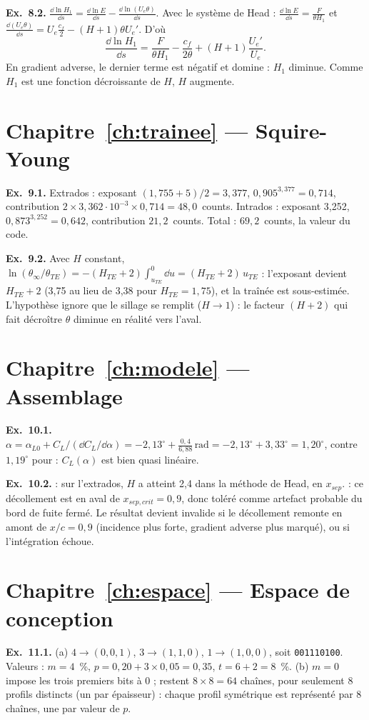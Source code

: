 \textbf{Ex.~8.2.} $\frac{\dd\ln H_1}{\dd s}=\frac{\dd\ln E}{\dd s}-\frac{\dd\ln(U_e\theta)}{\dd s}$. Avec le système de Head : $\frac{\dd\ln E}{\dd s}=\frac{F}{\theta H_1}$ et $\frac{\dd(U_e\theta)}{\dd s}=U_e\frac{c_f}{2}-(H+1)\theta U_e'$. D'où
\[
\frac{\dd\ln H_1}{\dd s}=\frac{F}{\theta H_1}-\frac{c_f}{2\theta}+(H+1)\frac{U_e'}{U_e}.
\]
En gradient adverse, le dernier terme est négatif et domine : $H_1$ diminue. Comme $H_1$ est une fonction décroissante de $H$, $H$ augmente.

\section*{Chapitre~\ref{ch:trainee} — Squire-Young}
\textbf{Ex.~9.1.} Extrados : exposant $(1{,}755+5)/2=3{,}377$, $0{,}905^{3{,}377}=0{,}714$, contribution $2\times3{,}362\cdot10^{-3}\times0{,}714=48{,}0$~counts. Intrados : exposant 3,252, $0{,}873^{3{,}252}=0{,}642$, contribution $21{,}2$~counts. Total : $69{,}2$~counts, la valeur du code.

\textbf{Ex.~9.2.} Avec $H$ constant, $\ln(\theta_\infty/\theta_{TE})=-(H_{TE}+2)\int_{u_{TE}}^0\dd u=(H_{TE}+2)\,u_{TE}$ : l'exposant devient $H_{TE}+2$ (3,75 au lieu de 3,38 pour $H_{TE}=1{,}75$), et la traînée est sous-estimée. L'hypothèse ignore que le sillage se remplit ($H\to1$) : le facteur $(H+2)$ qui fait décroître $\theta$ diminue en réalité vers l'aval.

\section*{Chapitre~\ref{ch:modele} — Assemblage}
\textbf{Ex.~10.1.} $\alpha=\alpha_{L0}+C_L/(\dd C_L/\dd\alpha)=-2{,}13^\circ+\frac{0{,}4}{6{,}88}\,\text{rad}=-2{,}13^\circ+3{,}33^\circ=1{,}20^\circ$, contre $1{,}19^\circ$ pour  : $C_L(\alpha)$ est bien quasi linéaire.

\textbf{Ex.~10.2.}  : sur l'extrados, $H$ a atteint 2,4 dans la méthode de Head, en $x_{sep}$.  : ce décollement est en aval de $x_{sep,crit}=0{,}9$, donc toléré comme artefact probable du bord de fuite fermé. Le résultat devient invalide si le décollement remonte en amont de $x/c=0{,}9$ (incidence plus forte, gradient adverse plus marqué), ou si l'intégration échoue.

\section*{Chapitre~\ref{ch:espace} — Espace de conception}
\textbf{Ex.~11.1.} (a) $4\to(0,0,1)$, $3\to(1,1,0)$, $1\to(1,0,0)$, soit \texttt{001110100}. Valeurs : $m=4$~\%, $p=0{,}20+3\times0{,}05=0{,}35$, $t=6+2=8$~\%. (b) $m=0$ impose les trois premiers bits à 0 ; restent $8\times8=64$ chaînes, pour seulement 8 profils distincts (un par épaisseur) : chaque profil symétrique est représenté par 8 chaînes, une par valeur de $p$.

